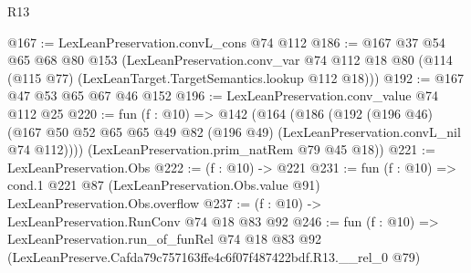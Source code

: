 \begin{lexlean}{R13}
\begin{coremodule}
@167 := LexLeanPreservation.convL_cons @74 @112
@186 := @167
    @37
    @54
    @65
    @68
    @80
    @153
    (LexLeanPreservation.conv_var
      @74
      @112
      @18
      @80
      (@114 (@115 @77) (LexLeanTarget.TargetSemantics.lookup @112 @18)))
@192 := @167 @47 @53 @65 @67 @46 @152
@196 := LexLeanPreservation.conv_value @74 @112 @25
@220 := fun (f : @10) =>
  @142
    (@164
      (@186
        (@192
          (@196 @46)
          (@167 @50 @52 @65 @65 @49 @82 (@196 @49) (LexLeanPreservation.convL_nil @74 @112))))
      (LexLeanPreservation.prim_natRem @79 @45 @18))
@221 := LexLeanPreservation.Obs
@222 := (f : @10) -> @221
@231 := fun (f : @10) =>
  cond.{1} @221 @87 (LexLeanPreservation.Obs.value @91) LexLeanPreservation.Obs.overflow
@237 := (f : @10) -> LexLeanPreservation.RunConv @74 @18 @83 @92
@246 := fun (f : @10) =>
  LexLeanPreservation.run_of_funRel
    @74
    @18
    @83
    @92
    (LexLeanPreserve.Cafda79c757163ffe4c6f07f487422bdf.R13.__rel_0 @79)
\end{coremodule}
\end{lexlean}

